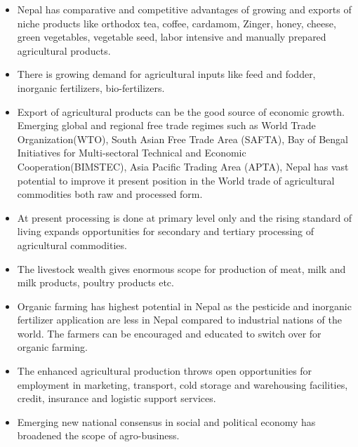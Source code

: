 \documentclass[12pt,ignorenonframetext,aspectratio=169]{beamer}
\providecommand{\tightlist}{%
  \setlength{\itemsep}{0pt}\setlength{\parskip}{0pt}}
\begin{document}
\begin{frame}{}
\protect\hypertarget{section-2}{}
\begin{itemize}
\tightlist
\item
  Nepal has comparative and competitive advantages of growing and
  exports of niche products like orthodox tea, coffee, cardamom, Zinger,
  honey, cheese, green vegetables, vegetable seed, labor intensive and
  manually prepared agricultural products.
\item
  There is growing demand for agricultural inputs like feed and fodder,
  inorganic fertilizers, bio-fertilizers.
\item
  Export of agricultural products can be the good source of economic
  growth. Emerging global and regional free trade regimes such as World
  Trade Organization(WTO), South Asian Free Trade Area (SAFTA), Bay of
  Bengal Initiatives for Multi-sectoral Technical and Economic
  Cooperation(BIMSTEC), Asia Pacific Trading Area (APTA), Nepal has vast
  potential to improve it present position in the World trade of
  agricultural commodities both raw and processed form.
\item
  At present processing is done at primary level only and the rising
  standard of living expands opportunities for secondary and tertiary
  processing of agricultural commodities.
\end{itemize}
\end{frame}

\begin{frame}{}
\protect\hypertarget{section-3}{}
\begin{itemize}
\tightlist
\item
  The livestock wealth gives enormous scope for production of meat, milk
  and milk products, poultry products etc.
\item
  Organic farming has highest potential in Nepal as the pesticide and
  inorganic fertilizer application are less in Nepal compared to
  industrial nations of the world. The farmers can be encouraged and
  educated to switch over for organic farming.
\item
  The enhanced agricultural production throws open opportunities for
  employment in marketing, transport, cold storage and warehousing
  facilities, credit, insurance and logistic support services.
\item
  Emerging new national consensus in social and political economy has
  broadened the scope of agro-business.
\end{itemize}
\end{frame}
\end{document}
